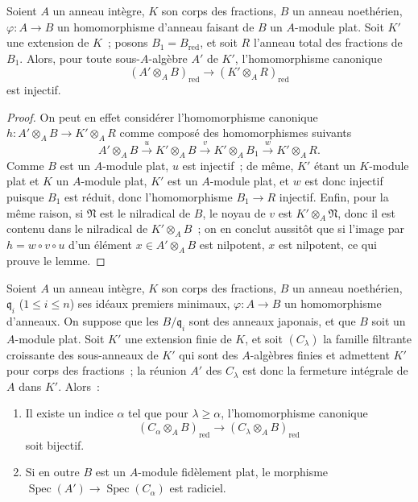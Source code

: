 \begin{lemma}[23.2.3]
\label{0.23.2.3-fr}
Soient $A$ un anneau intègre, $K$ son corps des fractions, $B$ un anneau
noethérien, $\varphi:A\to B$ un homomorphisme d'anneau faisant de $B$ un
$A$-module plat. Soit $K'$ une extension de $K$~; posons
$B_1=B_{\mathrm{red}}$, et soit $R$ l'anneau total des fractions de $B_1$.
Alors, pour toute sous-$A$-algèbre $A'$ de $K'$, l'homomorphisme canonique
\begin{equation}
\label{0.23.1.8.1-fr}
  (A'\otimes_AB)_{\mathrm{red}}
  \longrightarrow(K'\otimes_AR)_{\mathrm{red}}
  \tag{23.2.3.1}
\end{equation}
est injectif.
\end{lemma}

\begin{proof}
On peut en effet considérer l'homomorphisme canonique
$h:A'\otimes_AB\to K'\otimes_AR$ comme composé des homomorphismes suivants
\[
  A'\otimes_AB\xrightarrow{u}K'\otimes_AB
  \xrightarrow{v}K'\otimes_AB_1\xrightarrow{w}K'\otimes_AR.
\]
Comme $B$ est un $A$-module plat, $u$ est injectif~; de même, $K'$ étant un
$K$-module plat et $K$ un $A$-module plat, $K'$ est un $A$-module plat, et
$w$ est donc injectif puisque $B_1$ est réduit, donc l'homomorphisme
$B_1\to R$ injectif. Enfin, pour la même raison, si $\mathfrak N$ est
le nilradical de $B$, le noyau de $v$ est $K'\otimes_A\mathfrak N$, donc il est
contenu dans le nilradical de $K'\otimes_AB$~; on en conclut aussitôt que si
l'image par $h=w\circ v\circ u$ d'un élément $x\in A'\otimes_AB$ est
nilpotent, $x$ est nilpotent, ce qui prouve le lemme.
\end{proof}

\begin{proposition}[23.2.4]
\label{0.23.2.4-fr}
Soient $A$ un anneau intègre, $K$ son corps des fractions, $B$ un anneau
noethérien, $\mathfrak q_i$ ($1\leqslant i\leqslant n$) ses idéaux premiers
minimaux, $\varphi:A\to B$ un homomorphisme d'anneaux. On suppose que les
$B/\mathfrak q_i$ sont des anneaux japonais, et que $B$ soit un $A$-module
plat. Soit $K'$ une extension finie de $K$, et soit $(C_\lambda)$ la famille
filtrante croissante des sous-anneaux de $K'$ qui sont des $A$-algèbres
finies et admettent $K'$ pour corps des fractions~; la réunion $A'$ des
$C_\lambda$ est donc la fermeture intégrale de $A$ dans $K'$. Alors~:
\begin{enumerate}
  \item[\textup{(i)}] Il existe un indice $\alpha$ tel que pour $\lambda\geqslant
  \alpha$, l'homomorphisme canonique
  \begin{equation}
  \label{0.23.2.4.1-fr}
    (C_\alpha\otimes_AB)_{\mathrm{red}}
    \longrightarrow(C_\lambda\otimes_AB)_{\mathrm{red}}
    \tag{23.2.4.1}
  \end{equation}
  soit bijectif.
  \item[\textup{(ii)}] Si en outre $B$ est un $A$-module fidèlement plat, le morphisme
  $\operatorname{Spec}(A')\to\operatorname{Spec}(C_\alpha)$ est radiciel.
\end{enumerate}
\end{proposition}

